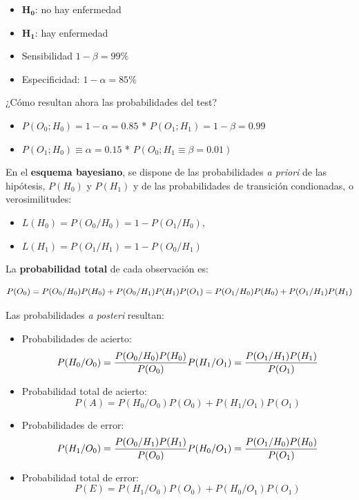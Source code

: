 \documentclass[11pt]{article}
\providecommand{\tightlist}{%
      \setlength{\itemsep}{0pt}\setlength{\parskip}{0pt}}
\begin{document}
\begin{itemize}
\tightlist
\item
  \(\mathbf{H_0}\): no hay enfermedad
\item
  \(\mathbf{H_1}\): hay enfermedad
\item
  Sensibilidad \(1-\beta = 99\%\)
\item
  Especificidad: \(1-\alpha=85\%\)
\end{itemize}

¿Cómo resultan ahora las probabilidades del test?
\begin{itemize}
\item \(P(O_0;H_0)=1-\alpha=0.85\) * \(P(O_1;H_1)=1-\beta=0.99\)
\item \(P(O_1;H_0)\equiv\alpha=0.15\) * \(P(O_0;H_1\equiv\beta=0.01)\)
\end{itemize}

    En el \textbf{esquema bayesiano}, se dispone de las probabilidades
\emph{a priori} de las hipótesis, \(P(H_0)\) y \(P(H_1)\) y de las
probabilidades de transición condionadas, o verosimilitudes: 
\begin{itemize}
\item \(L(H_0) = P(O_0/H_0) = 1-P(O_1/H_0)\),
\item \(L(H_1) = P(O_1/H_1) = 1-P(O_0/H_1)\)
\end{itemize}

La \textbf{probabilidad total} de cada observación es:

\[P(O_0)=P(O_0/H_0)P(H_0)+P(O_0/H_1)P(H_1)\\
P(O_1)=P(O_1/H_0)P(H_0)+P(O_1/H_1)P(H_1)\]

    Las probabilidades \emph{a posteri} resultan:

\begin{itemize}
\tightlist
\item
  Probabilidades de acierto:
  \[P(H_0/O_0)=\frac{P(O_0/H_0)P(H_0)}{P(O_0)}\\
  P(H_1/O_1)=\frac{P(O_1/H_1)P(H_1)}{P(O_1)}\]
\item
  Probabilidad total de acierto:
  \[P(A)=P(H_0/O_0)P(O_0)+P(H_1/O_1)P(O_1)\]
\end{itemize}

    \begin{itemize}
\tightlist
\item
  Probabilidades de error:
  \[P(H_1/O_0)=\frac{P(O_0/H_1)P(H_1)}{P(O_0)}\\
  P(H_0/O_1)=\frac{P(O_1/H_0)P(H_0)}{P(O_1)}\]
\item
  Probabilidad total de error:
  \[P(E)=P(H_1/O_0)P(O_0)+P(H_0/O_1)P(O_1)\]
\end{itemize}
\end{document}
